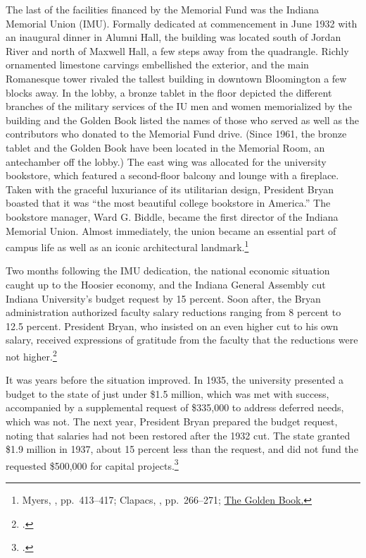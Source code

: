 \documentclass[
  american,
  letterpaper,
]{scrreprt}
\begin{document}
The last of the facilities financed by the Memorial Fund was the Indiana
Memorial Union (IMU). Formally dedicated at commencement in June 1932
with an inaugural dinner in Alumni Hall, the building was located south
of Jordan River and north of Maxwell Hall, a few steps away from the
quadrangle. Richly ornamented limestone carvings embellished the
exterior, and the main Romanesque tower rivaled the tallest building in
downtown Bloomington a few blocks away. In the lobby, a bronze tablet in
the floor depicted the different branches of the military services of
the IU men and women memorialized by the building and the Golden Book
listed the names of those who served as well as the contributors who
donated to the Memorial Fund drive. (Since 1961, the bronze tablet and
the Golden Book have been located in the Memorial Room, an antechamber
off the lobby.) The east wing was allocated for the university
bookstore, which featured a second-floor balcony and lounge with a
fireplace. Taken with the graceful luxuriance of its utilitarian design,
President Bryan boasted that it was ``the most beautiful college
bookstore in America.'' The bookstore manager, Ward G. Biddle, became
the first director of the Indiana Memorial Union. Almost immediately,
the union became an essential part of campus life as well as an iconic
architectural landmark.\footnote{Myers,
  ,
  pp.~413--417; Clapacs, , pp.~266--271;
  \href{https://goldenbook.iu.edu/}{The Golden Book.}}

Two months following the IMU dedication, the national economic situation
caught up to the Hoosier economy, and the Indiana General Assembly cut
Indiana University's budget request by 15 percent. Soon after, the Bryan
administration authorized faculty salary reductions ranging from 8
percent to 12.5 percent. President Bryan, who insisted on an even higher
cut to his own salary, received expressions of gratitude from the
faculty that the reductions were not higher.\footnote{.}

It was years before the situation improved. In 1935, the university
presented a budget to the state of just under \$1.5 million, which was
met with success, accompanied by a supplemental request of \$335,000 to
address deferred needs, which was not. The next year, President Bryan
prepared the budget request, noting that salaries had not been restored
after the 1932 cut. The state granted \$1.9 million in 1937, about 15
percent less than the request, and did not fund the requested \$500,000
for capital projects.\footnote{.}
\end{document}
